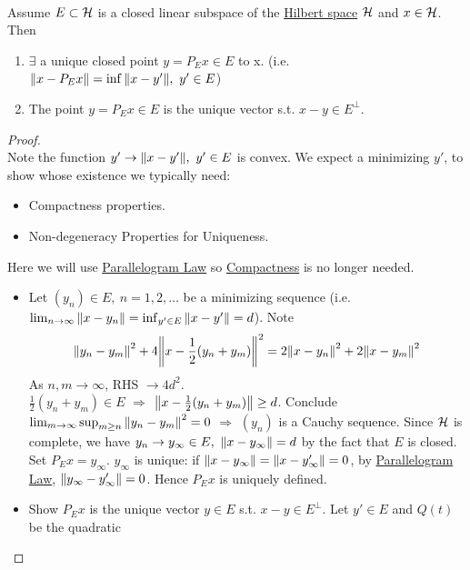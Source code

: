 \vspace{3pt}
\begin{theorem}\ \\
Assume $E \subset \mathcal{H}$ is a closed linear subspace of the \underline{Hilbert space} $\mathcal{H}$ and $x \in \mathcal{H}$. Then
\begin{enumerate}[label = (\alph*)]
    \item $\exists$ a unique closed point $y = P_E x \in E$ to x. (i.e. $\norm{x - P_E x} = \inf{\norm{x - y'}},\ y' \in E$)
    \item The point $y = P_E x \in E $ is the unique vector s.t. $x - y \in E^\perp$.
\end{enumerate}
\end{theorem}
\begin{proof}\ \\
Note the function $y' \to \norm{x - y'},\ y' \in E$ is convex. We expect a minimizing $y'$, to show whose existence we typically need:
\begin{itemize}
    \item Compactness properties.
    \item Non-degeneracy Properties for Uniqueness.
\end{itemize}
Here we will use \underline{Parallelogram Law} so \underline{Compactness} is no longer needed.
\begin{itemize}
    \item Let $(y_n) \in E,\ n=1,2,\dots$ be a minimizing sequence (i.e. $\lim_{n \to \infty} \norm{x - y_n} = \inf_{y' \in E} \norm{x - y'} = d$). Note
\begin{equation*}
    \norm{y_n - y_m}^2 + 4 \norm{x - \frac{1}{2} (y_n + y_m)}^2 = 2 \norm{x - y_n}^2 + 2 \norm{x - y_m}^2
\end{equation*}
As $n,m \to \infty$, RHS $\to 4d^2$. \\
$\frac{1}{2} (y_n + y_m) \in E$ $\Rightarrow$ $\norm{x - \frac{1}{2} (y_n + y_m)} \geq d$. Conclude $\lim_{m\to \infty} \sup_{m \geq n} \norm{y_n - y_m}^2 = 0$ $\Rightarrow$ $(y_n)$ is a Cauchy sequence. Since $\mathcal{H}$ is complete, we have $y_n \to y_\infty \in E,\ \norm{x - y_\infty} = d$ by the fact that $E$ is closed. Set $P_E x = y_\infty$. $y_\infty$ is unique: if $\norm{x - y_\infty} = \norm{x - y_\infty'} = 0$, by \underline{Parallelogram Law}, $\norm{y_\infty - y_\infty'} = 0$. Hence $P_E x$ is uniquely defined.
    \item Show $P_E x$ is the unique vector $y \in E$ s.t. $x - y \in E^\perp$. Let $y' \in E$ and $Q(t)$ be the quadratic

\end{itemize}
\end{proof}
